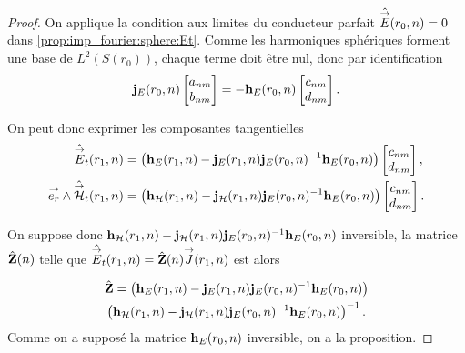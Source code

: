     \begin{proof}
      On applique la condition aux limites du conducteur parfait \(\hat {{\overset{\rightarrow}{E}}}(r_0,n) = 0\) dans \eqref{prop:imp_fourier:sphere:Et}.
      Comme les harmoniques sphériques forment une base de \(L^2(S(r_0))\), chaque terme doit être nul, donc par identification
      \begin{equation*}
        \mathbf{j}_{E}(r_0,n)
        \begin{bmatrix}
          a_{nm} \\
          b_{nm}
        \end{bmatrix}
        =-\mathbf{h}_{E}(r_0,n)
        \begin{bmatrix}
          c_{nm} \\
          d_{nm}
        \end{bmatrix}.
      \end{equation*}

      On peut donc exprimer les composantes tangentielles%
      \begin{align*}
        \hat {{\overset{\rightarrow}{E}}}_t(r_1,n) &=
        \left(\mathbf{h}_{E}(r_1,n) - \mathbf{j}_{E}(r_1,n)\mathbf{j}_{E}(r_0,n)^{-1}\mathbf{h}_{E}(r_0,n)\right)
        \begin{bmatrix}
          c_{nm} \\
          d_{nm}
        \end{bmatrix},
        \\
        {\overset{\rightarrow}{e_r}}\wedge \hat {{\overset{\rightarrow}{\mathcal{H}}}}_t(r_1,n) &=
        \left(\mathbf{h}_{\mathcal{H}}(r_1,n) - \mathbf{j}_{\mathcal{H}}(r_1,n)\mathbf{j}_{E}(r_0,n)^{-1}\mathbf{h}_{E}(r_0,n) \right)
        \begin{bmatrix}
          c_{nm} \\
          d_{nm}
        \end{bmatrix}.
      \end{align*}

      On suppose donc \(\mathbf{h}_{\mathcal{H}}(r_1,n) - \mathbf{j}_{\mathcal{H}}(r_1,n)\mathbf{j}_{E}(r_0,n)^{-1}\mathbf{h}_{E}(r_0,n)\) inversible, la matrice \(\hat{\mathbf{Z}}(n)\) telle que \(\hat{{\overset{\rightarrow}{E}}}_t(r_1,n) = \hat{\mathbf{Z}}(n) {\overset{\rightarrow}{J}}(r_1,n)\) est alors

      \begin{multline*}
        \hat {\mathbf{Z}} =
        \left(\mathbf{h}_{E}(r_1,n) - \mathbf{j}_{E}(r_1,n)\mathbf{j}_{E}(r_0,n)^{-1}\mathbf{h}_{E}(r_0,n)\right)
        \\
        \left(\mathbf{h}_{\mathcal{H}}(r_1,n) - \mathbf{j}_{\mathcal{H}}(r_1,n)\mathbf{j}_{E}(r_0,n)^{-1}\mathbf{h}_{E}(r_0,n)\right)^{-1}.
      \end{multline*}
      Comme on a supposé la matrice \(\mathbf{h}_E(r_0,n)\) inversible, on a la proposition.

    \end{proof}


